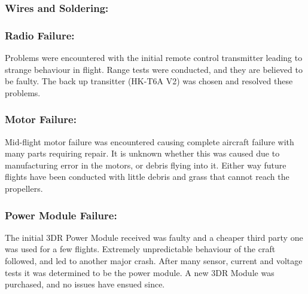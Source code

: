 \subsubsection*{Wires and Soldering:}  

\subsubsection*{Radio Failure:} Problems were encountered with the initial remote control  transmitter leading to strange behaviour in flight. Range tests were conducted, and they are believed to be faulty. The back up transitter (HK-T6A V2) was chosen and resolved these problems.

\subsubsection*{Motor Failure:} Mid-flight motor failure was encountered causing complete aircraft failure with many parts requiring repair. It is unknown whether this was caused due to manufacturing error in the motors, or debris flying into it. Either way future flights have been conducted with little debris and grass that cannot reach the propellers. 

\subsubsection*{Power Module Failure:}  The initial 3DR Power Module received was faulty and a cheaper third party one was used for a few flights. Extremely unpredictable behaviour of the craft followed, and led to another major crash. After many sensor, current and voltage tests it was determined to be the power module. A new 3DR Module was purchased, and no issues have ensued since.  

